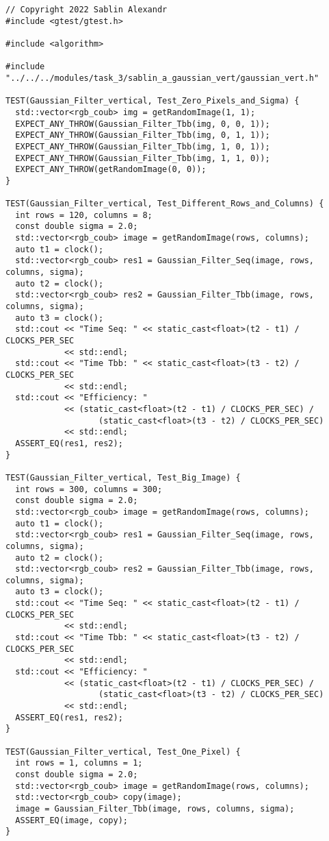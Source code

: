 \documentclass{report}
\begin{document}
\begin{lstlisting}
// Copyright 2022 Sablin Alexandr
#include <gtest/gtest.h>

#include <algorithm>

#include "../../../modules/task_3/sablin_a_gaussian_vert/gaussian_vert.h"

TEST(Gaussian_Filter_vertical, Test_Zero_Pixels_and_Sigma) {
  std::vector<rgb_coub> img = getRandomImage(1, 1);
  EXPECT_ANY_THROW(Gaussian_Filter_Tbb(img, 0, 0, 1));
  EXPECT_ANY_THROW(Gaussian_Filter_Tbb(img, 0, 1, 1));
  EXPECT_ANY_THROW(Gaussian_Filter_Tbb(img, 1, 0, 1));
  EXPECT_ANY_THROW(Gaussian_Filter_Tbb(img, 1, 1, 0));
  EXPECT_ANY_THROW(getRandomImage(0, 0));
}

TEST(Gaussian_Filter_vertical, Test_Different_Rows_and_Columns) {
  int rows = 120, columns = 8;
  const double sigma = 2.0;
  std::vector<rgb_coub> image = getRandomImage(rows, columns);
  auto t1 = clock();
  std::vector<rgb_coub> res1 = Gaussian_Filter_Seq(image, rows, columns, sigma);
  auto t2 = clock();
  std::vector<rgb_coub> res2 = Gaussian_Filter_Tbb(image, rows, columns, sigma);
  auto t3 = clock();
  std::cout << "Time Seq: " << static_cast<float>(t2 - t1) / CLOCKS_PER_SEC
            << std::endl;
  std::cout << "Time Tbb: " << static_cast<float>(t3 - t2) / CLOCKS_PER_SEC
            << std::endl;
  std::cout << "Efficiency: "
            << (static_cast<float>(t2 - t1) / CLOCKS_PER_SEC) /
                   (static_cast<float>(t3 - t2) / CLOCKS_PER_SEC)
            << std::endl;
  ASSERT_EQ(res1, res2);
}

TEST(Gaussian_Filter_vertical, Test_Big_Image) {
  int rows = 300, columns = 300;
  const double sigma = 2.0;
  std::vector<rgb_coub> image = getRandomImage(rows, columns);
  auto t1 = clock();
  std::vector<rgb_coub> res1 = Gaussian_Filter_Seq(image, rows, columns, sigma);
  auto t2 = clock();
  std::vector<rgb_coub> res2 = Gaussian_Filter_Tbb(image, rows, columns, sigma);
  auto t3 = clock();
  std::cout << "Time Seq: " << static_cast<float>(t2 - t1) / CLOCKS_PER_SEC
            << std::endl;
  std::cout << "Time Tbb: " << static_cast<float>(t3 - t2) / CLOCKS_PER_SEC
            << std::endl;
  std::cout << "Efficiency: "
            << (static_cast<float>(t2 - t1) / CLOCKS_PER_SEC) /
                   (static_cast<float>(t3 - t2) / CLOCKS_PER_SEC)
            << std::endl;
  ASSERT_EQ(res1, res2);
}

TEST(Gaussian_Filter_vertical, Test_One_Pixel) {
  int rows = 1, columns = 1;
  const double sigma = 2.0;
  std::vector<rgb_coub> image = getRandomImage(rows, columns);
  std::vector<rgb_coub> copy(image);
  image = Gaussian_Filter_Tbb(image, rows, columns, sigma);
  ASSERT_EQ(image, copy);
}


\end{lstlisting}
\end{document}
